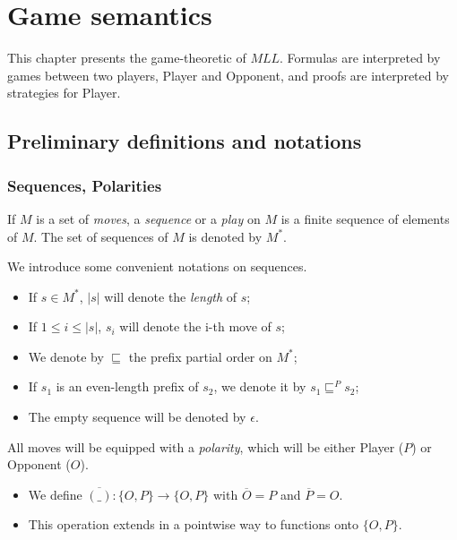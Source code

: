 \chapter{Game semantics}\label{game-semantics}

This chapter presents the game-theoretic  of \(MLL\).
Formulas are interpreted by games between two players, Player and Opponent, and
proofs are interpreted by strategies for Player.

\section{Preliminary definitions and notations}\label{preliminary-definitions-and-notations}

\subsection{Sequences, Polarities}\label{sequences-polarities}

\begin{definition}[Sequences]
If $M$ is a set of \emph{moves}, a \emph{sequence} or a \emph{play} on $M$ is a finite sequence of elements of $M$. The set of sequences of $M$ is denoted by $M^*$.
\end{definition}

We introduce some convenient notations on sequences.
\begin{itemize}
\item If \(s\in M^*\), \(|s|\) will denote the \emph{length} of \(s\);
\item If \(1\leq i\leq |s|\), \(s_i\) will denote the i-th move of \(s\);
\item We denote by \(\sqsubseteq\) the prefix partial order on \(M^*\);
\item If \(s_1\) is an even-length prefix of \(s_2\), we denote it by \(s_1\sqsubseteq^P s_2\);
\item The empty sequence will be denoted by \(\epsilon\).
\end{itemize}

All moves will be equipped with a \emph{polarity}, which will be either Player (\(P\)) or Opponent (\(O\)).

\begin{itemize}
\item We define \(\overline{(\_)}:\{O,P\}\to \{O,P\}\) with \(\overline{O} = P\) and \(\overline{P} = O\).
\item This operation extends in a pointwise way to functions onto \(\{O,P\}\).
\end{itemize}

